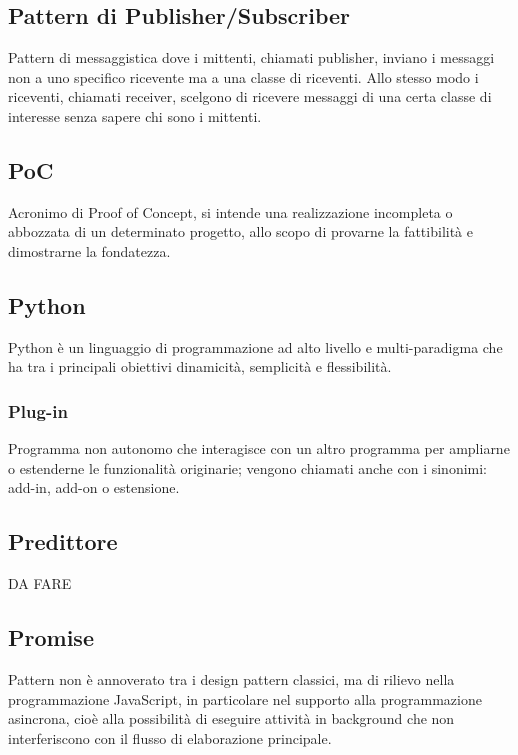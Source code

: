 \subsection*{Pattern di Publisher/Subscriber}
Pattern di messaggistica dove i mittenti, chiamati publisher, inviano i messaggi non a uno specifico ricevente ma a una classe di riceventi. Allo stesso modo i riceventi, chiamati receiver, scelgono di ricevere messaggi di una certa classe di interesse senza sapere chi sono i  mittenti.




\subsection*{PoC}
Acronimo di Proof of Concept, si intende una realizzazione incompleta o abbozzata di un determinato progetto, allo scopo di provarne la fattibilità e dimostrarne la fondatezza.

\subsection*{Python}
Python è un linguaggio di programmazione ad alto livello e multi-paradigma che ha tra i principali obiettivi dinamicità, semplicità e flessibilità. 

\subsubsection*{Plug-in}
Programma non autonomo che interagisce con un altro programma per ampliarne o estenderne le funzionalità originarie; vengono chiamati anche con i sinonimi: add-in, add-on o estensione.

\subsection*{Predittore}
DA FARE

\subsection*{Promise}
Pattern non è annoverato tra i design pattern classici, ma di rilievo nella programmazione JavaScript, in particolare nel supporto alla programmazione asincrona, cioè alla possibilità di eseguire attività in background che non interferiscono con il flusso di elaborazione principale. 

